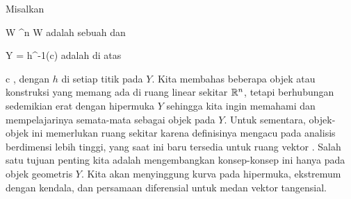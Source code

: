 
Misalkan

\mavergleichskette
{\vergleichskette
{ W
}
{ \subseteq }{ \R^n
}
{  }{
}
{    }{
}
{   }{
}
}
{}{}{}
 { W } { \R
} {}
adalah sebuah
dan

\mavergleichskette
{\vergleichskette
{ Y
}
{ = }{ h^{-1}(c)
}
{  }{
}
{    }{
}
{   }{
}
}
{}{}{}
adalah
di atas

\mavergleichskette
{\vergleichskette
{ c
}
{ \in }{ \R
}
{  }{
}
{    }{
}
{   }{
}
}
{}{}{,}
dengan $h$
di setiap titik pada $Y$. Kita membahas beberapa objek atau konstruksi yang memang ada di ruang linear sekitar ${\mathbb R}^n$, tetapi berhubungan sedemikian erat dengan hipermuka $Y$ sehingga kita ingin memahami dan mempelajarinya semata-mata sebagai objek pada $Y$. Untuk sementara, objek-objek ini memerlukan ruang sekitar karena definisinya mengacu pada analisis berdimensi lebih tinggi, yang saat ini baru tersedia untuk ruang vektor
 {} {}.
Salah satu tujuan penting kita adalah mengembangkan konsep-konsep ini hanya pada objek geometris
 {} {}
$Y$. Kita akan menyinggung kurva pada hipermuka, ekstremum dengan kendala, dan persamaan diferensial untuk medan vektor tangensial.

